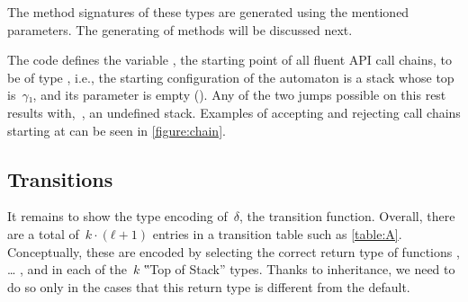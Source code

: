 The method signatures of these types are generated using the mentioned parameters.
The generating of methods will be discussed next.

The code defines the  variable , the starting point
of all fluent API call chains, to be of type , i.e.,
  the starting configuration of the automaton is a stack whose top is~$γ₁$,
  and its  parameter is empty ().
Any of the two jumps possible on this rest results with,~,
  an undefined stack.
Examples of accepting and rejecting call chains starting at 
  can be seen in \cref{figure:chain}.

\subsection{Transitions}
It remains to show the type encoding of~$δ$,
  the transition function.
Overall, there are a total of~$k·(ℓ+1)$
  entries in a transition table such as \cref{table:A}.
Conceptually, these are encoded by selecting the correct return
  type of functions , … , and \cc{\$()} in each
  of the~$k$ ‟Top of Stack” types.
Thanks to inheritance, we need to do so only in the cases that this
  return type is different from the default.

